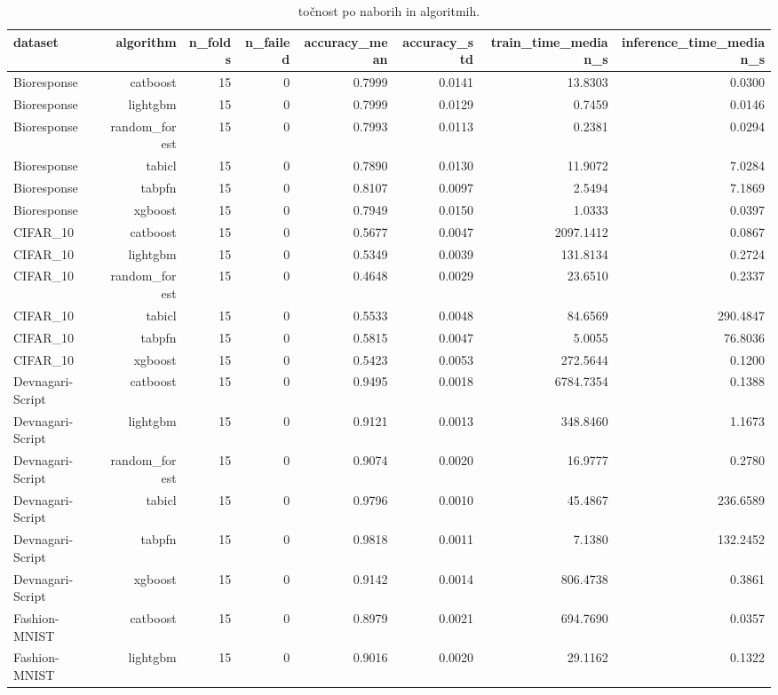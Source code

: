 \begin{table}[htbp]
\centering
\caption{točnost po naborih in algoritmih.}
\label{tab:per-dataset}
\begin{tabular}{lrrrrrrr}
\hline
dataset & algorithm & n\_folds & n\_failed & accuracy\_mean & accuracy\_std & train\_time\_median\_s & inference\_time\_median\_s \\
\hline
Bioresponse & catboost & 15 & 0 & 0.7999 & 0.0141 & 13.8303 & 0.0300 \\
Bioresponse & lightgbm & 15 & 0 & 0.7999 & 0.0129 & 0.7459 & 0.0146 \\
Bioresponse & random\_forest & 15 & 0 & 0.7993 & 0.0113 & 0.2381 & 0.0294 \\
Bioresponse & tabicl & 15 & 0 & 0.7890 & 0.0130 & 11.9072 & 7.0284 \\
Bioresponse & tabpfn & 15 & 0 & 0.8107 & 0.0097 & 2.5494 & 7.1869 \\
Bioresponse & xgboost & 15 & 0 & 0.7949 & 0.0150 & 1.0333 & 0.0397 \\
CIFAR\_10 & catboost & 15 & 0 & 0.5677 & 0.0047 & 2097.1412 & 0.0867 \\
CIFAR\_10 & lightgbm & 15 & 0 & 0.5349 & 0.0039 & 131.8134 & 0.2724 \\
CIFAR\_10 & random\_forest & 15 & 0 & 0.4648 & 0.0029 & 23.6510 & 0.2337 \\
CIFAR\_10 & tabicl & 15 & 0 & 0.5533 & 0.0048 & 84.6569 & 290.4847 \\
CIFAR\_10 & tabpfn & 15 & 0 & 0.5815 & 0.0047 & 5.0055 & 76.8036 \\
CIFAR\_10 & xgboost & 15 & 0 & 0.5423 & 0.0053 & 272.5644 & 0.1200 \\
Devnagari-Script & catboost & 15 & 0 & 0.9495 & 0.0018 & 6784.7354 & 0.1388 \\
Devnagari-Script & lightgbm & 15 & 0 & 0.9121 & 0.0013 & 348.8460 & 1.1673 \\
Devnagari-Script & random\_forest & 15 & 0 & 0.9074 & 0.0020 & 16.9777 & 0.2780 \\
Devnagari-Script & tabicl & 15 & 0 & 0.9796 & 0.0010 & 45.4867 & 236.6589 \\
Devnagari-Script & tabpfn & 15 & 0 & 0.9818 & 0.0011 & 7.1380 & 132.2452 \\
Devnagari-Script & xgboost & 15 & 0 & 0.9142 & 0.0014 & 806.4738 & 0.3861 \\
Fashion-MNIST & catboost & 15 & 0 & 0.8979 & 0.0021 & 694.7690 & 0.0357 \\
Fashion-MNIST & lightgbm & 15 & 0 & 0.9016 & 0.0020 & 29.1162 & 0.1322 \\

\end{tabular}
\end{table}
